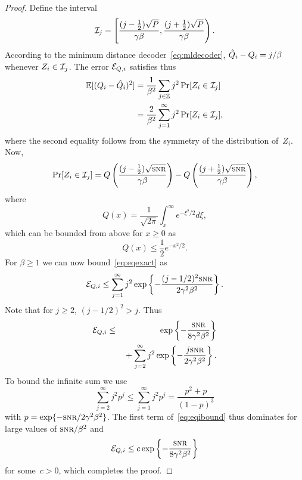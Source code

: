 \begin{proof}
  Define the interval
  \begin{equation*}
    \mathcal{I}_j = \left[ \frac{(j - \frac12) \sqrt{P}}{\gamma\beta},
    \frac{(j + \frac12) \sqrt{P}}{\gamma\beta } \right).
  \end{equation*}
  According to the minimum distance decoder~\eqref{eq:mldecoder}, $\hat{Q}_i - Q_i
  = j/\beta$ whenever $Z_i \in \mathcal{I}_j$.  The error ${{\mathcal{E}}_{Q,i}}$ satisfies thus
  \begin{align}
    \mathbb{E}[(Q_i - \hat{Q}_i)^2] &= \frac{1}{\beta^2} \sum_{j \in \mathbb{Z}} j^2 \Pr[Z_i \in
    \mathcal{I}_j]  \nonumber \\
    &= \frac{2}{\beta^2} \sum_{j = 1}^\infty j^2 \Pr[Z_i \in \mathcal{I}_j],
    \label{eq:eqexact}
  \end{align}
  where the second equality follows from the symmetry of the distribution
  of~$Z_i$. Now,
  \begin{equation*}
    \Pr[Z_i \in \I_j] = Q\left( \frac{(j - \frac12) \sqrt \snr}{\gamma\beta}
    \right) - Q\left( \frac{(j + \frac12) \sqrt{\snr}}{\gamma\beta } \right),
  \end{equation*}
  where
  \begin{equation*}
    Q(x) = \frac{1}{\sqrt{2\pi}} \int_x^\infty e^{-\xi^2/2} d\xi,
  \end{equation*}
  which can be bounded from above for $x \ge 0$ as
  \begin{equation*}
    Q(x) \le \frac12 e^{-x^2/2}.
  \end{equation*}
  For $\beta \ge 1$ we can now bound~\eqref{eq:eqexact} as
  \begin{equation*}
    \Eqi \le \sum_{j=1}^\infty j^2 \exp\left\{ - \frac{(j - 1/2)^2
    \snr}{2\gamma^2\beta^2} \right\}.
  \end{equation*}
  Note that for $j \ge 2$, $(j - 1/2)^2 > j$.  Thus
  \begin{eqnarray}
    \Eqi &\le & \exp \left \{ - \frac{\snr}{8 \gamma^2 \beta^2} \right\}
    \nonumber \\
    & & \mbox{} + 
    \sum_{j = 2}^\infty j^2 \exp \left \{ - \frac{j \snr}{2\gamma^2 \beta^2}
    \right\}. \label{eq:eqibound}
  \end{eqnarray}
  To bound the infinite sum we use 
  \begin{equation}
    \label{eq:geomsum}
    \sum_{j=2}^\infty j^2 p^j \le \sum_{j=1}^\infty j^2 p^j = 
    \frac{p^2+p}{(1-p)^3}
  \end{equation}
  with $p = \exp\{-\snr/2 \gamma^2 \beta^2\}$. The first term
  of~\eqref{eq:eqibound} thus dominates for large values of
  $\snr/\beta^2$ and
  \begin{equation*}
    \Eqi \le c\exp\left\{ - \frac{\snr}{8 \gamma^2 \beta^2} \right\}
  \end{equation*}
  for some~$c > 0$, which completes the proof. 
\end{proof}

